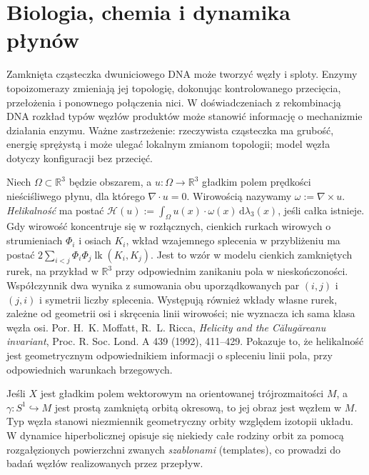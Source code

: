 \section{Biologia, chemia i dynamika płynów}
\label{sec:kt-zastosowania}

\begin{przyklad}
Zamknięta cząsteczka dwuniciowego DNA może tworzyć
węzły i sploty. Enzymy topoizomerazy zmieniają jej
topologię, dokonując kontrolowanego przecięcia,
przełożenia i ponownego połączenia nici. W doświadczeniach
z rekombinacją DNA rozkład typów węzłów produktów
może stanowić informację o mechanizmie działania enzymu.
Ważne zastrzeżenie: rzeczywista cząsteczka ma grubość,
energię sprężystą i może ulegać lokalnym zmianom topologii;
model węzła dotyczy konfiguracji bez przecięć.
\end{przyklad}

\begin{przyklad}
Niech $\Omega\subset\mathbb R^3$ będzie obszarem,
a $u\colon\Omega\to\mathbb R^3$ gładkim polem prędkości
nieściśliwego płynu, dla którego
$\nabla\cdot u=0$. Wirowością nazywamy
$\omega:=\nabla\times u$.
\emph{Helikalność} ma postać
$\mathcal H(u):=\int_\Omega u(x)\cdot\omega(x)\,
\mathrm d\lambda_3(x)$, jeśli całka istnieje.
Gdy wirowość koncentruje się w rozłącznych, cienkich
rurkach wirowych o strumieniach $\Phi_i$ i osiach
$K_i$, wkład wzajemnego splecenia w przybliżeniu
ma postać $2\sum_{i<j}\Phi_i\Phi_j\operatorname{lk}(K_i,K_j)$.
Jest to wzór w modelu cienkich zamkniętych rurek,
na przykład w $\mathbb R^3$ przy odpowiednim
zanikaniu pola w nieskończoności. Współczynnik
dwa wynika z sumowania obu uporządkowanych par
$(i,j)$ i $(j,i)$ i symetrii liczby splecenia.
Występują również wkłady własne rurek, zależne
od geometrii osi i skręcenia linii wirowości;
nie wyznacza ich sama klasa węzła osi.
Por. H.~K. Moffatt, R.~L. Ricca,
\emph{Helicity and the Călugăreanu invariant},
Proc. R. Soc. Lond. A 439 (1992), 411--429. Pokazuje to, że helikalność jest
geometrycznym odpowiednikiem informacji o spleceniu
linii pola, przy odpowiednich warunkach brzegowych.
\end{przyklad}

\begin{uwaga}
Jeśli $X$ jest gładkim polem wektorowym na orientowanej
trójrozmaitości $M$, a $\gamma\colon S^1\hookrightarrow M$
jest prostą zamkniętą orbitą okresową, to jej obraz
jest węzłem w $M$. Typ węzła stanowi niezmiennik
geometryczny orbity względem izotopii układu.
W dynamice hiperbolicznej opisuje się niekiedy całe rodziny
orbit za pomocą rozgałęzionych powierzchni zwanych
\emph{szablonami} (templates), co prowadzi do badań
węzłów realizowanych przez przepływ.
\end{uwaga}

